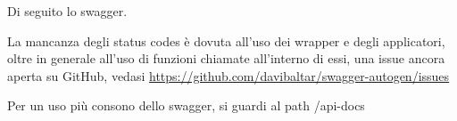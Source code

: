 Di seguito lo swagger.

\alert{La mancanza degli status codes è dovuta all'uso dei wrapper e degli applicatori, oltre in generale all'uso di funzioni chiamate all'interno di essi, una issue ancora aperta su GitHub, vedasi \url{https://github.com/davibaltar/swagger-autogen/issues}}

\alert{Per un uso più consono dello swagger, si guardi al path /api-docs}

